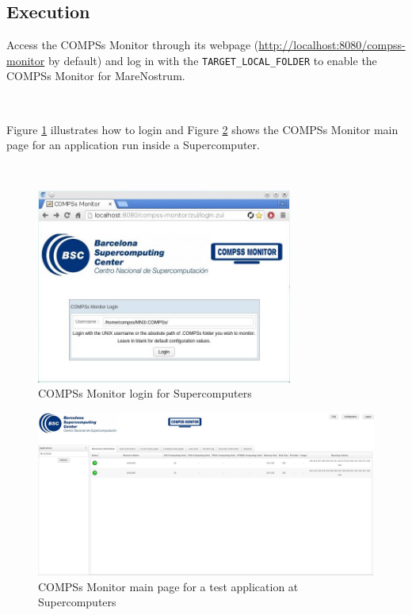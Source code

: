 \subsection{Execution}
Access the COMPSs Monitor through its webpage (\url{http://localhost:8080/compss-monitor} by default) and log in with the 
\verb|TARGET_LOCAL_FOLDER| to enable the COMPSs Monitor for MareNostrum. 


\newpage

~ \newline

Figure \ref{fig:mn_monitor1} illustrates how to login and Figure \ref{fig:mn_monitor2} shows the COMPSs Monitor
main page for an application run inside a Supercomputer. 

~ \newline

\begin{figure}[!htb]
  \centering
    \includegraphics[width=0.75\textwidth]{./Sections/6_Monitor/Figures/mn_monitor1.jpeg}
    \caption{COMPSs Monitor login for Supercomputers}
    \label{fig:mn_monitor1}
\end{figure}

\newpage

\begin{figure}[!htb]
  \centering
    \includegraphics[width=\textwidth]{./Sections/6_Monitor/Figures/mn_monitor2.jpeg}
    \caption{COMPSs Monitor main page for a test application at Supercomputers}
    \label{fig:mn_monitor2}
\end{figure}
